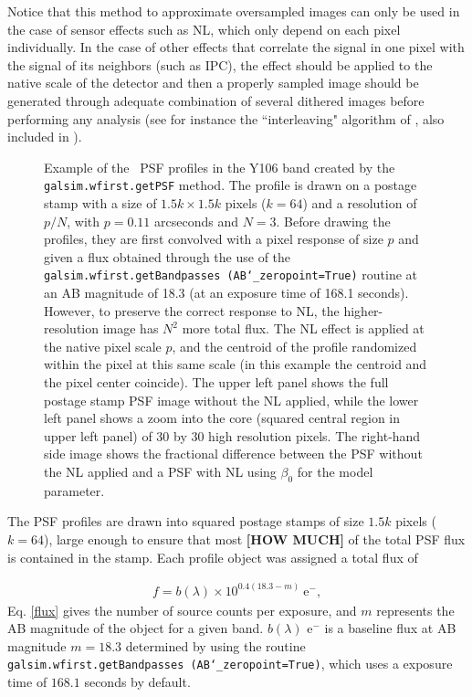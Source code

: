 \documentclass[11pt,preprint,flushrt]{aastex}
\begin{document}
Notice that this method to approximate oversampled images can only be used in the case of sensor effects such as NL, which only depend on each pixel individually. In the case of other effects that correlate the signal in one pixel with the signal of its neighbors (such as IPC), the effect should be applied to the native scale of the detector and then a properly sampled image should be generated through adequate combination of several dithered images before performing any analysis (see for instance the ``interleaving" algorithm of \citealt{kannawadi15}, also included in \gs). 

\begin{figure}[!ht]
\centering
{}
\caption{Example of the \wfa\ PSF profiles in the Y106 band created by the {\tt{galsim.wfirst.getPSF}} method. The profile is drawn on a postage stamp with a size of $1.5k \times1.5k$ pixels ($k=64$) and a resolution of $p/N$, with $p=0.11$ arcseconds and $N=3$. Before drawing the profiles, they are first convolved with a pixel response of size $p$ and given a flux obtained through the use of the {\tt{galsim.wfirst.getBandpasses (AB\char`_zeropoint=True)}} routine at an AB magnitude of 18.3 (at an exposure time of 168.1 seconds). However, to preserve the correct response to NL, the higher-resolution image has $N^2$ more total flux. The NL effect is applied at the native pixel scale $p$, and the centroid of the profile randomized within the pixel at this same scale (in this example the centroid and the pixel center coincide). The upper left panel shows the full postage stamp PSF image without the NL applied, while the lower left panel shows a zoom into the core (squared central region in upper left panel) of 30 by 30 high resolution pixels. The right-hand side image shows the fractional difference between the PSF without the NL applied and a PSF with NL using $\beta_0$ for the model parameter.} 
\label{f1}
\end{figure}

The PSF profiles are drawn into squared postage stamps of size $1.5k$ pixels ($k=64$), large enough to ensure that most \textbf{[HOW MUCH]} of the total PSF flux is contained in the stamp. %
Each profile object was assigned a total flux of 

\begin{align}
f=b(\lambda)\times10^{0.4 (18.3-m)} \ \mathrm{e^-}, 
\label{flux}
\end{align}
Eq. \ref{flux} gives the number of source counts per exposure, and $m$ represents the AB magnitude of the object for a given band. $b(\lambda)$ e$^{-}$ is a baseline flux at AB magnitude $m=18.3$ determined by using the routine {\tt{galsim.wfirst.getBandpasses (AB\char`_zeropoint=True)}}, which uses a exposure time of $168.1$ seconds by default. 
\end{document}
